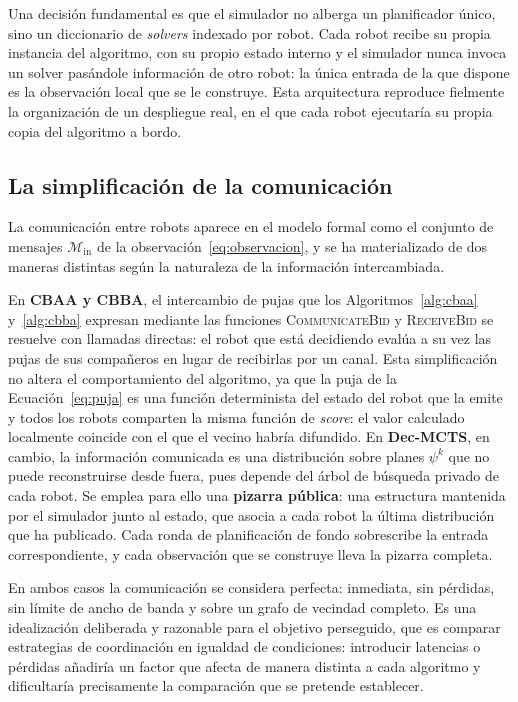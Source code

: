 Una decisión fundamental es que el simulador no alberga un planificador único, sino un diccionario de \textit{solvers} indexado por robot. Cada robot recibe su propia instancia del algoritmo, con su propio estado interno y el simulador nunca invoca un solver pasándole información de otro robot: la única entrada de la que dispone es la observación local que se le construye. Esta arquitectura reproduce fielmente la organización de un despliegue real, en el que cada robot ejecutaría su propia copia del algoritmo a bordo.

\subsection{La simplificación de la comunicación} \label{subsec:mat-comunicacion}

La comunicación entre robots aparece en el modelo formal como el conjunto de mensajes $\mathcal{M}_{\mathrm{in}}$ de la observación~\eqref{eq:observacion}, y se ha materializado de dos maneras distintas según la naturaleza de la información intercambiada.

En \textbf{CBAA y CBBA}, el intercambio de pujas que los Algoritmos~\ref{alg:cbaa} y~\ref{alg:cbba} expresan mediante las funciones \textsc{CommunicateBid} y \textsc{ReceiveBid} se resuelve con llamadas directas: el robot que está decidiendo evalúa a su vez las pujas de sus compañeros en lugar de recibirlas por un canal. Esta simplificación no altera el comportamiento del algoritmo, ya que la puja de la Ecuación~\eqref{eq:puja} es una función determinista del estado del robot que la emite y todos los robots comparten la misma función de \textit{score}: el valor calculado localmente coincide con el que el vecino habría difundido. En \textbf{Dec-MCTS}, en cambio, la información comunicada es una distribución sobre planes $\psi^{k}$ que no puede reconstruirse desde fuera, pues depende del árbol de búsqueda privado de cada robot. Se emplea para ello una \textbf{pizarra pública}: una estructura mantenida por el simulador junto al estado, que asocia a cada robot la última distribución que ha publicado. Cada ronda de planificación de fondo sobrescribe la entrada correspondiente, y cada observación que se construye lleva la pizarra completa.

En ambos casos la comunicación se considera perfecta: inmediata, sin pérdidas, sin límite de ancho de banda y sobre un grafo de vecindad completo. Es una idealización deliberada y razonable para el objetivo perseguido, que es comparar estrategias de coordinación en igualdad de condiciones: introducir latencias o pérdidas añadiría un factor que afecta de manera distinta a cada algoritmo y dificultaría precisamente la comparación que se pretende establecer.

